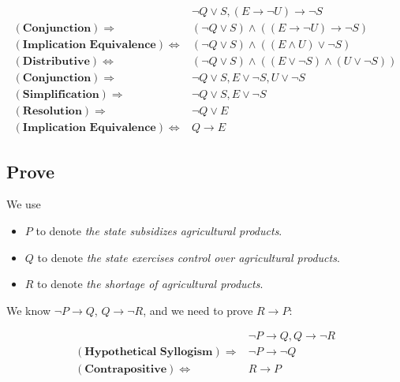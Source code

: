 \documentclass{article}
\begin{document}
$$
\begin{aligned}
    &\lnot Q\vee S,(E\rightarrow\lnot U)\rightarrow\lnot S\\
    (\textbf{Conjunction})\Rightarrow&(\lnot Q\vee S)\wedge((E\rightarrow\lnot U)\rightarrow\lnot S)\\
    (\textbf{Implication Equivalence})\Leftrightarrow&(\lnot Q\vee S)\wedge((E\wedge U)\vee\lnot S)\\
    (\textbf{Distributive})\Leftrightarrow&(\lnot Q\vee S)\wedge((E\vee\lnot S)\wedge(U\vee\lnot S))\\
    (\textbf{Conjunction})\Rightarrow&\lnot Q\vee S,E\vee\lnot S,U\vee\lnot S\\
    (\textbf{Simplification})\Rightarrow&\lnot Q\vee S,E\vee\lnot S\\
    (\textbf{Resolution})\Rightarrow&\lnot Q\vee E\\
    (\textbf{Implication Equivalence})\Leftrightarrow&Q\rightarrow E
\end{aligned}
$$

\subsection{Prove}

We use

\begin{itemize}
    \item $P$ to denote \textit{the state subsidizes agricultural products}.
    \item $Q$ to denote \textit{the state exercises control over agricultural products}.
    \item $R$ to denote \textit{the shortage of agricultural products}.
\end{itemize}

We know $\lnot P\rightarrow Q$, $Q\rightarrow\lnot R$, and we need to prove $R\rightarrow P$:

$$
\begin{aligned}
    &\lnot P\rightarrow Q,Q\rightarrow\lnot R\\
    (\textbf{Hypothetical Syllogism})\Rightarrow&\lnot P\rightarrow\lnot Q\\
    (\textbf{Contrapositive})\Leftrightarrow&R\rightarrow P
\end{aligned}
$$
\end{document}
